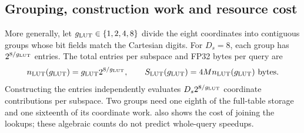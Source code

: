 \subsection{Grouping, construction work and resource cost}

More generally, let $g_{\mathrm{LUT}}\in\{1,2,4,8\}$ divide the eight coordinates
into contiguous groups whose bit fields match the Cartesian digits.
For $D_s=8$, each group has $2^{8/g_{\mathrm{LUT}}}$ entries. The total entries
per subspace and FP32 bytes per query are
\begin{equation}
 n_{\rm LUT}(g_{\mathrm{LUT}})=g_{\mathrm{LUT}} 2^{8/g_{\mathrm{LUT}}},\qquad S_{\rm LUT}(g_{\mathrm{LUT}})=4Mn_{\rm LUT}(g_{\mathrm{LUT}})\ \text{bytes}.
 \label{eq:5-lut-cost}
\end{equation}
Constructing the entries independently evaluates $D_s2^{8/g_{\mathrm{LUT}}}$
coordinate contributions per subspace. Two groups need one eighth of
the full-table storage and one sixteenth of its coordinate work.
 also shows the cost of joining the lookups;
these algebraic counts do not predict whole-query speedups.

